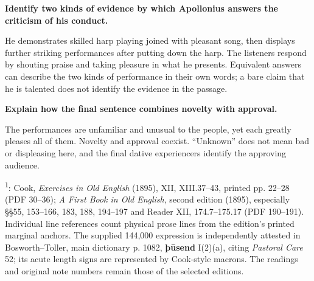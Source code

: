 \textbf{Identify two kinds of evidence by which Apollonius answers the criticism of his conduct.}

He demonstrates skilled harp playing joined with pleasant song, then displays further striking performances after putting down the harp. The listeners respond by shouting praise and taking pleasure in what he presents. Equivalent answers can describe the two kinds of performance in their own words; a bare claim that he is talented does not identify the evidence in the passage.

\textbf{Explain how the final sentence combines novelty with approval.}

The performances are unfamiliar and unusual to the people, yet each greatly pleases all of them. Novelty and approval coexist. “Unknown” does not mean bad or displeasing here, and the final dative experiencers identify the approving audience.

\textsuperscript{1}: Cook, \emph{Exercises in Old English} (1895), XII, XIII.37–43, printed pp. 22–28 (PDF 30–36); \emph{A First Book in Old English}, second edition (1895), especially §§55, 153–166, 183, 188, 194–197 and Reader XII, 174.7–175.17 (PDF 190–191). Individual line references count physical prose lines from the edition's printed marginal anchors. The supplied 144,000 expression is independently attested in Bosworth–Toller, main dictionary p. 1082, \textbf{þūsend} I(2)(a), citing \emph{Pastoral Care} 52; its acute length signs are represented by Cook-style macrons. The readings and original note numbers remain those of the selected editions.


\par\label{end-ch17-key}
\clearpage\endgroup
